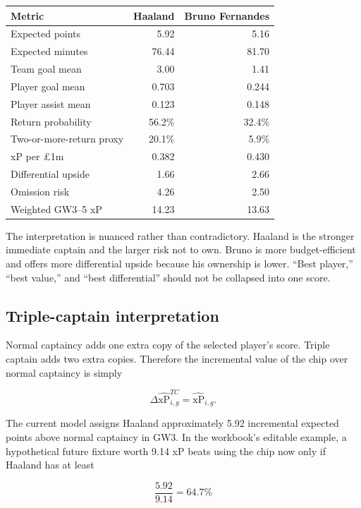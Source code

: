 \documentclass[11pt,a4paper]{article}
\newcommand{\xp}{\widehat{\mathrm{xP}}}
\begin{document}
\begin{center}
\begin{tabular}{lrr}
\toprule
Metric & Haaland & Bruno Fernandes\\
\midrule
Expected points & 5.92 & 5.16\\
Expected minutes & 76.44 & 81.70\\
Team goal mean & 3.00 & 1.41\\
Player goal mean & 0.703 & 0.244\\
Player assist mean & 0.123 & 0.148\\
Return probability & 56.2\% & 32.4\%\\
Two-or-more-return proxy & 20.1\% & 5.9\%\\
xP per \pounds1m & 0.382 & 0.430\\
Differential upside & 1.66 & 2.66\\
Omission risk & 4.26 & 2.50\\
Weighted GW3--5 xP & 14.23 & 13.63\\
\bottomrule
\end{tabular}
\end{center}

The interpretation is nuanced rather than contradictory. Haaland is the stronger immediate captain and the larger risk not to own. Bruno is more budget-efficient and offers more differential upside because his ownership is lower. ``Best player,'' ``best value,'' and ``best differential'' should not be collapsed into one score.

\subsection{Triple-captain interpretation}

Normal captaincy adds one extra copy of the selected player's score. Triple captain adds two extra copies. Therefore the incremental value of the chip over normal captaincy is simply

\begin{equation}
\Delta \xp^{TC}_{i,g}=\xp_{i,g}.
\end{equation}

The current model assigns Haaland approximately 5.92 incremental expected points above normal captaincy in GW3. In the workbook's editable example, a hypothetical future fixture worth 9.14 xP beats using the chip now only if Haaland has at least

\begin{equation}
\frac{5.92}{9.14}=64.7\%
\end{equation}
\end{document}

